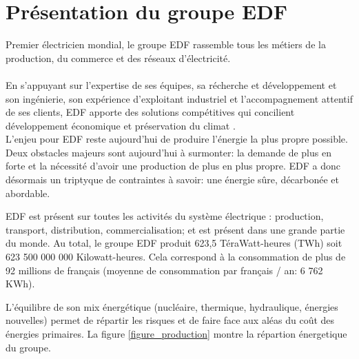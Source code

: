 \documentclass[11pt,a4paper]{article}
\begin{document}
\tableofcontents
\thispagestyle{empty}
\newpage
\listoffigures

\newpage
\section{Présentation du groupe EDF \label{presentation_groupe}}
Premier électricien mondial, le groupe EDF rassemble tous les métiers de la production, du commerce et des réseaux d’électricité.\\\\

En s’appuyant sur l’expertise de ses équipes, sa récherche et développement et son ingénierie, son expérience d’exploitant industriel et l’accompagnement attentif de ses clients, EDF apporte des solutions compétitives qui concilient développement économique et préservation du climat \cite{edf}.\\
L’enjeu pour EDF reste aujourd’hui de produire l’énergie la plus propre possible. Deux obstacles majeurs sont aujourd’hui à surmonter: la demande de plus en forte et la nécessité d’avoir une production de plus en plus propre. EDF a donc désormais un triptyque de contraintes à savoir: une énergie sûre, décarbonée et abordable. 

EDF est présent sur toutes les activités du système électrique : production, transport, distribution, commercialisation; et est présent dans une grande partie du monde. Au total, le groupe EDF produit 623,5 TéraWatt-heures (TWh) soit 623 500 000 000 Kilowatt-heures. Cela correspond à la consommation de plus de 92 millions de français (moyenne de consommation par français / an: 6 762 KWh). 

L’équilibre de son mix énergétique (nucléaire, thermique, hydraulique, énergies nouvelles) permet de répartir les risques et de faire face aux aléas du coût des énergies primaires. La figure \ref{figure_production} montre la répartion énergetique du groupe.  
\end{document}
